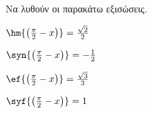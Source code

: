 Να λυθούν οι παρακάτω εξισώσεις.
\begin{multicols}{2}
\begin{alist}[leftmargin=2mm]
\item $ \hm{\left( \frac{\pi}{2}-x\right) }=\frac{\sqrt{2}}{2} $
\item $ \syn{\left(\frac{\pi}{2}-x\right) }=-\frac{1}{2} $
\item $ \ef{\left(\frac{\pi}{2}-x\right) }=\frac{\sqrt{3}}{3} $
\item $ \syf{\left(\frac{\pi}{2}-x \right) }=1 $
\end{alist}
\end{multicols}
